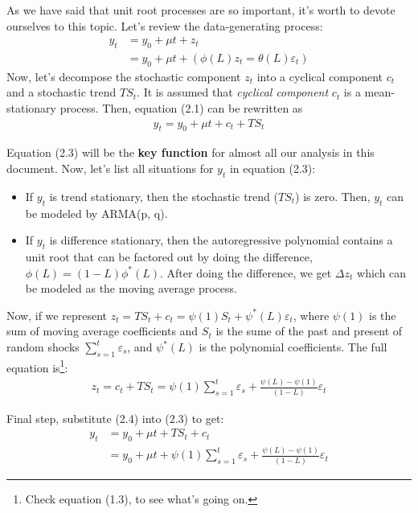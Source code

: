 \documentclass[12pt]{article}
\theoremstyle{definition}
\numberwithin{equation}{section}
\numberwithin{figure}{section}
\numberwithin{table}{section}
\begin{document}
As we have said that unit root processes are so important, it's worth to devote ourselves to this topic. Let's review the data-generating process:
\begin{align}
  y_t & = y_0 + \mu t + z_t \\
      & = y_0 + \mu t + (\phi(L) z_t = \theta(L) \varepsilon_t)
\end{align}
Now, let's decompose the stochastic component $z_t$ into a cyclical component $c_t$ and a stochastic trend $TS_t$. It is assumed that \textit{cyclical component} $c_t$ is a mean-stationary process. Then, equation (2.1) can be rewritten as
\begin{align}
  y_t = y_0 + \mu t + c_t + TS_t
\end{align}

Equation (2.3) will be the \textbf{key function} for almost all our analysis in this document. Now, let's list all situations for $y_t$ in equation (2.3):
\begin{itemize}
  \item If $y_t$ is trend stationary, then the stochastic trend ($TS_t$) is zero. Then, $y_t$ can be modeled by ARMA(p, q).
  \item If $y_t$ is difference stationary, then the autoregressive polynomial contains a unit root that can be factored out by doing the difference, $\phi(L) = (1- L)\phi^{*}(L)$. After doing the difference, we get $\Delta z_t$ which can be modeled as the moving average process.
\end{itemize}

Now, if we represent $z_t = TS_t + c_t = \psi(1) S_t + \psi^{*}(L) \varepsilon_t$, where $\psi(1)$ is the sum of moving average coefficients and $S_t$ is the sume of the past and present of random shocks $\sum_{s=1}^t \varepsilon_s$, and $\psi^{*}(L)$ is the polynomial coefficients. The full equation is\footnote{Check equation (1.3), to see what's going on.}:
\begin{align}
  z_t = c_t + TS_t = \psi(1) \sum_{s=1}^t \varepsilon_s + \frac{\psi(L) - \psi(1)}{(1 - L)} \varepsilon_t
\end{align}

Final step, substitute (2.4) into (2.3) to get:
\begin{align}
  y_t & = y_0 + \mu t + TS_t + c_t \\
      & = y_0 + \mu t + \psi(1) \sum_{s=1}^t \varepsilon_s + \frac{\psi(L) - \psi(1)}{(1 - L)} \varepsilon_t
\end{align}
\end{document}
